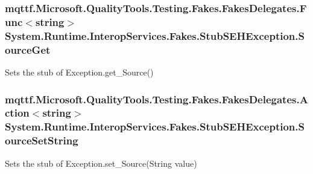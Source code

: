 \hypertarget{class_system_1_1_runtime_1_1_interop_services_1_1_fakes_1_1_stub_s_e_h_exception_abed776d226c5283935a1bfc92bd8a939}{
\subsubsection[{Source\-Get}]{\setlength{\rightskip}{0pt plus 5cm}mqttf.\-Microsoft.\-Quality\-Tools.\-Testing.\-Fakes.\-Fakes\-Delegates.\-Func$<$string$>$ System.\-Runtime.\-Interop\-Services.\-Fakes.\-Stub\-S\-E\-H\-Exception.\-Source\-Get}}\label{class_system_1_1_runtime_1_1_interop_services_1_1_fakes_1_1_stub_s_e_h_exception_abed776d226c5283935a1bfc92bd8a939}


Sets the stub of Exception.\-get\-\_\-\-Source()

\hypertarget{class_system_1_1_runtime_1_1_interop_services_1_1_fakes_1_1_stub_s_e_h_exception_a1256f302fdd49cb27cc5e7cf97f553d0}{
\subsubsection[{Source\-Set\-String}]{\setlength{\rightskip}{0pt plus 5cm}mqttf.\-Microsoft.\-Quality\-Tools.\-Testing.\-Fakes.\-Fakes\-Delegates.\-Action$<$string$>$ System.\-Runtime.\-Interop\-Services.\-Fakes.\-Stub\-S\-E\-H\-Exception.\-Source\-Set\-String}}\label{class_system_1_1_runtime_1_1_interop_services_1_1_fakes_1_1_stub_s_e_h_exception_a1256f302fdd49cb27cc5e7cf97f553d0}


Sets the stub of Exception.\-set\-\_\-\-Source(\-String value)

